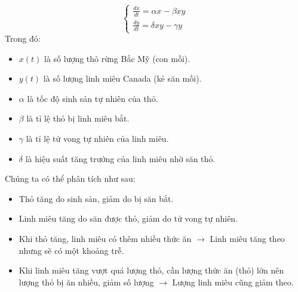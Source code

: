 \documentclass[a4paper,15pt]{article}
\begin{document}
\[
\begin{cases}
    \frac{dx}{dt} = \alpha x - \beta x y \\
    \frac{dy}{dt} = \delta x y - \gamma y
\end{cases}
\]
Trong đó:
\begin{itemize}
    \item $x(t)$ là số lượng thỏ rừng Bắc Mỹ (con mồi).
    \item $y(t)$ là số lượng linh miêu Canada (kẻ săn mồi).
    \item $\alpha$ là tốc độ sinh sản tự nhiên của thỏ.
    \item $\beta$ là tỉ lệ thỏ bị linh miêu bắt.
    \item $\gamma$ là tỉ lệ tử vong tự nhiên của linh miêu.
    \item $\delta$ là hiệu suất tăng trưởng của linh miêu nhờ săn thỏ.
\end{itemize}
Chúng ta có thể phân tích như sau:
\begin{itemize}
    \item Thỏ tăng do sinh sản, giảm do bị săn bắt.
    \item Linh miêu tăng do săn được thỏ, giảm do tử vong tự nhiên.
    \item Khi thỏ tăng, linh miêu có thêm nhiều thức ăn $\rightarrow $ Linh miêu tăng theo nhưng sẽ có một khoảng trễ.
    \item Khi linh miêu tăng vượt quá lượng thỏ, cần lượng thức ăn (thỏ) lớn nên lượng thỏ bị ăn nhiều, giảm số lượng $\rightarrow$ Lượng linh miêu cũng giảm theo.
\end{itemize}
\end{document}
